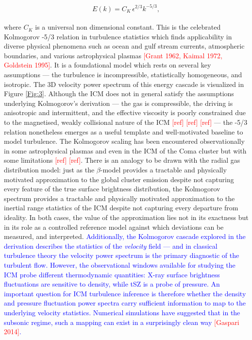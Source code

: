 \begin{equation}
	E(k) = C_K\, \epsilon^{2/3} k^{-5/3},
	\label{eq:kolmogorov}
\end{equation}
\\
where $C_K$ is a universal non dimensional constant. This is the celebrated Kolmogorov -5/3 relation in turbulence statistics which finds applicability in diverse physical phenomena such as ocean and gulf stream currents, atmospheric boundaries, and various astrophysical plasmas \textcolor{red}{[Grant 1962, Kaimal 1972, Goldstein 1995]}. It is a foundational model which rests on several key assumptions — the turbulence is incompressible, statistically homogeneous, and isotropic. The 3D velocity power spectrum of this energy cascade is visualized in Figure \ref{Fig:3}.
\pbreak
Although the ICM does not in general satisfy the assumptions underlying Kolmogorov's derivation — the gas is compressible, the driving is anisotropic and intermittent, and the effective viscosity is poorly constrained due to the magnetised, weakly collisional nature of the ICM \textcolor{red}{[ref]} \textcolor{red}{[ref]} \textcolor{red}{[ref]} — the -5/3 relation nonetheless emerges as a useful template and well-motivated baseline to model turbulence. The Kolmogorov scaling has been encountered observationally in some astrophysical plasmas and even in the ICM of the Coma cluster but with some limitations \textcolor{red}{[ref]} \textcolor{red}{[ref]}. 
\pbreak
There is an analogy to be drawn with the radial gas distribution model: just as the $\beta$-model provides a tractable and physically motivated approximation to the global cluster emission despite not capturing every feature of the true surface brightness distribution, the Kolmogorov spectrum provides a tractable and physically motivated approximation to the inertial range statistics of the ICM despite not capturing every departure from ideality. In both cases, the value of the approximation lies not in its exactness but in its role as a controlled reference model against which deviations can be measured, and interpreted.
\pbreak
\textcolor{blue}{Additionally, the Kolmogorov cascade explored in the derivation describes the statistics of the \textit{velocity} field — and in classical turbulence theory the velocity power spectrum is the primary diagnostic of the turbulent flow. However, the observational windows available for studying the ICM probe different thermodynamic quantities: X-ray surface brightness fluctuations are sensitive to density, while tSZ is a probe of pressure. An important question for ICM turbulence inference is therefore whether the density and pressure fluctuation power spectra carry sufficient information to map to the underlying velocity statistics. Numerical simulations have suggested that in the subsonic regime, such a mapping can exist in a surprisingly clean way \textcolor{red}{[Gaspari 2014]}.}

